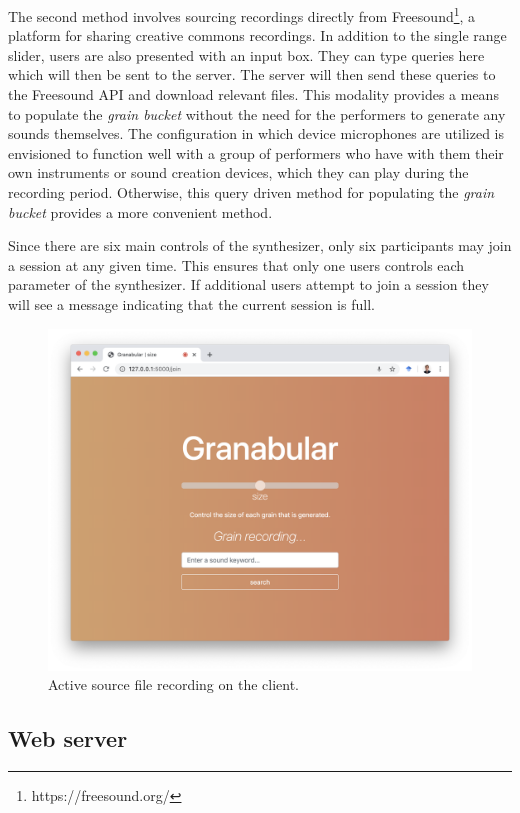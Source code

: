 \documentclass{nime-alternate}
\begin{document}
The second method involves sourcing recordings directly from Freesound\footnote{https://freesound.org/}, 
a platform for sharing creative commons recordings. 
In addition to the single range slider, users are also presented with an input box. 
They can type queries here which will then be sent to the server. The server will then send these queries to the Freesound API and download relevant files.
This modality provides a means to populate the \emph{grain bucket} without the need for the performers to generate any sounds themselves. 
The configuration in which device microphones are utilized is envisioned to function well with a group of performers who have with them
their own instruments or sound creation devices, which they can play during the recording period. Otherwise, this query driven method
for populating the \emph{grain bucket} provides a more convenient method. 

Since there are six main controls of the synthesizer, only six participants may join a session at any given time.
This ensures that only one users controls each parameter of the synthesizer. 
If additional users attempt to join a session they will see a message indicating that the current session is full.

\begin{figure}[h] \label{fig:recording}
	\includegraphics[width=\linewidth]{../img/recording.png}
	\caption{Active source file recording on the client.}
	\centering
\end{figure}

\subsection{Web server}
\end{document}
